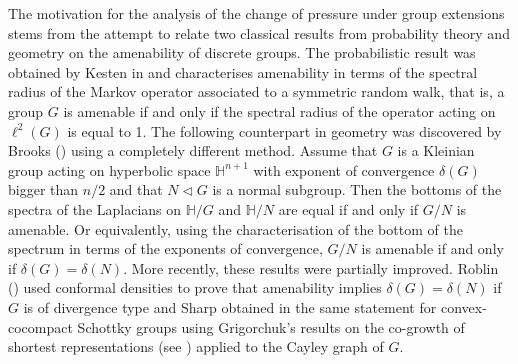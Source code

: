 \documentclass[10pt]{article}
\theoremstyle{mystyle}
\renewcommand{\H}{\mathbb{H}}
\newcommand{\1}{\mathbf{1}}
\begin{document}
The motivation for the analysis of the change of pressure under group extensions stems from the attempt to relate two  classical results from probability theory and geometry on the amenability of discrete groups. The probabilistic result was obtained by Kesten in \cite{Kesten:1959a} and characterises amenability in terms of the spectral radius of the Markov operator associated to a symmetric random walk, that is, a group $G$ is amenable if and only if the spectral radius of the operator acting on $\ell^2(G)$ is equal to 1. The following counterpart in geometry was discovered by Brooks (\cite{Brooks:1985}) using a completely different method. Assume that $G$ is a Kleinian group acting on hyperbolic space $\H^{n+1}$ with exponent of convergence $\delta(G)$ bigger than $n/2$ and that $N \lhd G$ is a normal subgroup. Then the bottoms of the spectra of the Laplacians on $\H/G$ and $\H/N$ are equal if and only if $G/N$ is amenable. Or equivalently, using the characterisation of the bottom of the spectrum in terms of the exponents of convergence, $G/N$ is amenable if and only if 
 $\delta(G)=\delta(N)$. More recently, these results were partially improved. Roblin (\cite{Roblin:2005}) used conformal densities to prove that amenability implies $\delta(G)=\delta(N)$ if $G$ is of divergence type and Sharp obtained in \cite{Sharp:2007} the same statement for convex-cocompact Schottky groups using Grigorchuk's results on the co-growth of shortest representations (see \cite{Grigorchuk:1980}) applied to the Cayley graph of $G$.
  
\end{document}
